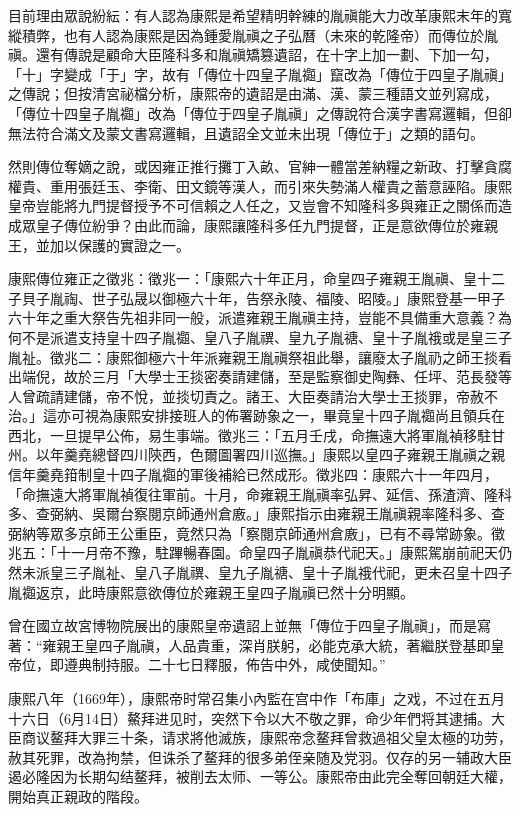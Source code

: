 目前理由眾說紛紜：有人認為康熙是希望精明幹練的胤禛能大力改革康熙末年的寬縱積弊，也有人認為康熙是因為鍾愛胤禛之子弘曆（未來的乾隆帝）而傳位於胤禛。還有傳說是顧命大臣隆科多和胤禛矯篡遺詔，在十字上加一劃、下加一勾，「十」字變成「于」字，故有「傳位十四皇子胤禵」竄改為「傳位于四皇子胤禛」之傳說；但按清宮祕檔分析，康熙帝的遺詔是由滿、漢、蒙三種語文並列寫成，「傳位十四皇子胤禵」改為「傳位于四皇子胤禛」之傳說符合漢字書寫邏輯，但卻無法符合滿文及蒙文書寫邏輯，且遺詔全文並未出現「傳位于」之類的語句。

然則傳位奪嫡之說，或因雍正推行攤丁入畝、官紳一體當差納糧之新政、打擊貪腐權貴、重用張廷玉、李衛、田文鏡等漢人，而引來失勢滿人權貴之蓄意誣陷。康熙皇帝豈能將九門提督授予不可信賴之人任之，又豈會不知隆科多與雍正之關係而造成眾皇子傳位紛爭？由此而論，康熙讓隆科多任九門提督，正是意欲傳位於雍親王，並加以保護的實證之一。

康熙傳位雍正之徵兆：徵兆一：「康熙六十年正月，命皇四子雍親王胤禛、皇十二子貝子胤祹、世子弘晟以御極六十年，告祭永陵、福陵、昭陵。」康熙登基一甲子六十年之重大祭告先祖非同一般，派遣雍親王胤禛主持，豈能不具備重大意義？為何不是派遣支持皇十四子胤禵、皇八子胤禩、皇九子胤禟、皇十子胤䄉或是皇三子胤祉。徵兆二：康熙御極六十年派雍親王胤禛祭祖此舉，讓廢太子胤礽之師王掞看出端倪，故於三月「大學士王掞密奏請建儲，至是監察御史陶彝、任坪、范長發等人曾疏請建儲，帝不悅，並掞切責之。諸王、大臣奏請治大學士王掞罪，帝赦不治。」這亦可視為康熙安排接班人的佈署跡象之一，畢竟皇十四子胤禵尚且領兵在西北，一旦提早公佈，易生事端。徵兆三：「五月壬戌，命撫遠大將軍胤禎移駐甘州。以年羹堯總督四川陝西，色爾圖署四川巡撫。」康熙以皇四子雍親王胤禛之親信年羹堯箝制皇十四子胤禵的軍後補給已然成形。徵兆四：康熙六十一年四月，「命撫遠大將軍胤禎復往軍前。十月，命雍親王胤禛率弘昇、延信、孫渣濟、隆科多、查弼納、吳爾台察閱京師通州倉廒。」康熙指示由雍親王胤禛親率隆科多、查弼納等眾多京師王公重臣，竟然只為「察閱京師通州倉廒」，已有不尋常跡象。徵兆五：「十一月帝不豫，駐蹕暢春園。命皇四子胤禛恭代祀天。」康熙駕崩前祀天仍然未派皇三子胤祉、皇八子胤禩、皇九子胤禟、皇十子胤䄉代祀，更未召皇十四子胤禵返京，此時康熙意欲傳位於雍親王皇四子胤禛已然十分明顯。

曾在國立故宮博物院展出的康熙皇帝遺詔上並無「傳位于四皇子胤禛」，而是寫著：“雍親王皇四子胤禛，人品貴重，深肖朕躬，必能克承大統，著繼朕登基即皇帝位，即遵典制持服。二十七日釋服，佈告中外，咸使聞知。”

康熙八年（1669年），康熙帝时常召集小內監在宫中作「布庫」之戏，不过在五月十六日（6月14日）鰲拜进见时，突然下令以大不敬之罪，命少年們将其逮捕。大臣商议鳌拜大罪三十条，请求將他滅族，康熙帝念鳌拜曾救過祖父皇太極的功劳，赦其死罪，改為拘禁，但诛杀了鳌拜的很多弟侄亲随及党羽。仅存的另一辅政大臣遏必隆因为长期勾结鳌拜，被削去太师、一等公。康熙帝由此完全奪回朝廷大權，開始真正親政的階段。

